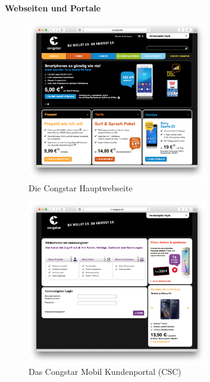 \documentclass[11pt,a4paper]{article} %
\begin{document}
\begin{center}
\textbf{Webseiten und Portale}
\end{center}

\begin{figure}[H]
\includegraphics[width=0.7\textwidth]{images/Sites/Congstar_Main.png}
\centering
\caption{Die Congstar Hauptwebseite \cite{cmain}}
\end{figure}

\begin{figure}[H]
\includegraphics[width=0.7\textwidth]{images/Sites/Congstar_Mobil_CSC.png}
\centering
\caption{Das Congstar Mobil Kundenportal (CSC) \cite{ccsc}}
\end{figure}
\end{document}
